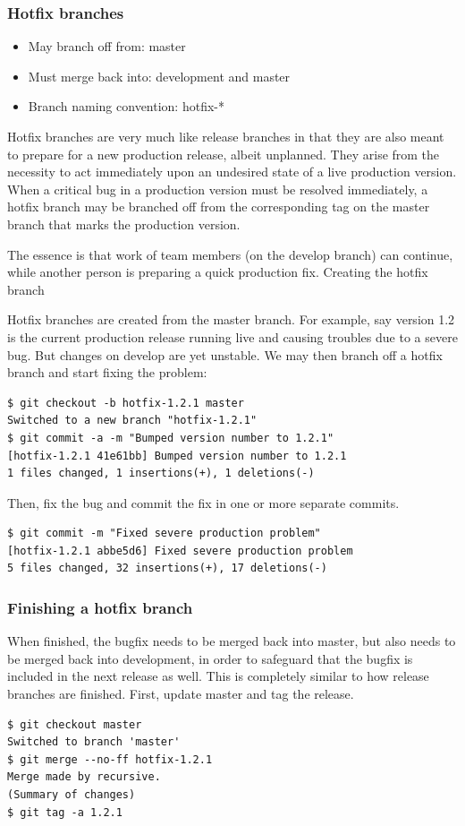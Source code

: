 \subsubsection{Hotfix branches}
\begin{itemize}[itemsep=1pt, parsep=1pt]
  \item May branch off from: master
  \item Must merge back into: development and master
  \item Branch naming convention: hotfix-*
\end{itemize}

Hotfix branches are very much like release branches in that they are also meant
to prepare for a new production release, albeit unplanned. They arise from the
necessity to act immediately upon an undesired state of a live production
version. When a critical bug in a production version must be resolved
immediately, a hotfix branch may be branched off from the corresponding tag on
the master branch that marks the production version.

The essence is that work of team members (on the develop branch) can continue,
while another person is preparing a quick production fix. Creating the hotfix
branch

Hotfix branches are created from the master branch. For example, say version 1.2
is the current production release running live and causing troubles due to a
severe bug. But changes on develop are yet unstable. We may then branch off a
hotfix branch and start fixing the problem:
\begin{verbatim}
$ git checkout -b hotfix-1.2.1 master
Switched to a new branch "hotfix-1.2.1"
$ git commit -a -m "Bumped version number to 1.2.1"
[hotfix-1.2.1 41e61bb] Bumped version number to 1.2.1
1 files changed, 1 insertions(+), 1 deletions(-)
\end{verbatim}
Then, fix the bug and commit the fix in one or more separate commits.
\begin{verbatim}
$ git commit -m "Fixed severe production problem"
[hotfix-1.2.1 abbe5d6] Fixed severe production problem
5 files changed, 32 insertions(+), 17 deletions(-)
\end{verbatim}

\subsubsection{Finishing a hotfix branch}

When finished, the bugfix needs to be merged back into master, but also needs to
be merged back into development, in order to safeguard that the bugfix is
included in the next release as well. This is completely similar to how release
branches are finished. First, update master and tag the release.
\begin{verbatim}
$ git checkout master
Switched to branch 'master'
$ git merge --no-ff hotfix-1.2.1
Merge made by recursive.
(Summary of changes)
$ git tag -a 1.2.1
\end{verbatim}


